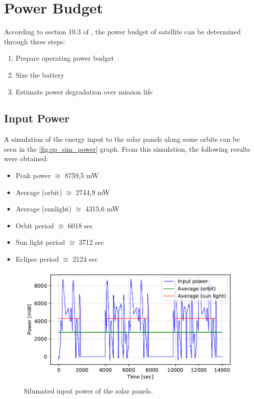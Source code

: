 \section{Power Budget} \label{power-budget}

According to section 10.3 of \cite{larson2005}, the power budget of satellite can be determined through three steps:

\begin{enumerate}
    \item Prepare operating power budget
    \item Size the battery
    \item Estimate power degradation over mission life
\end{enumerate}

\subsection{Input Power}

A simulation of the energy input to the solar panels along some orbits can be seen in the \autoref{fig:sp_sim_power} graph. From this simulation, the following results were obtained:

\begin{itemize}
    \item Peak power $\cong$ 8759,5 mW
    \item Average (orbit) $\cong$ 2744,9 mW
    \item Average (sunlight) $\cong$ 4315,6 mW
    \item Orbit period $\cong$ 6018 sec
    \item Sun light period $\cong$ 3712 sec
    \item Eclipse period $\cong$ 2124 sec
\end{itemize}

\begin{figure}[!ht]
    \begin{center}
        \includegraphics[width=\textwidth]{curves/sp_sim_power}
        \caption{Silumated input power of the solar panels.}
        \label{fig:sp_sim_power}
    \end{center}
\end{figure}


